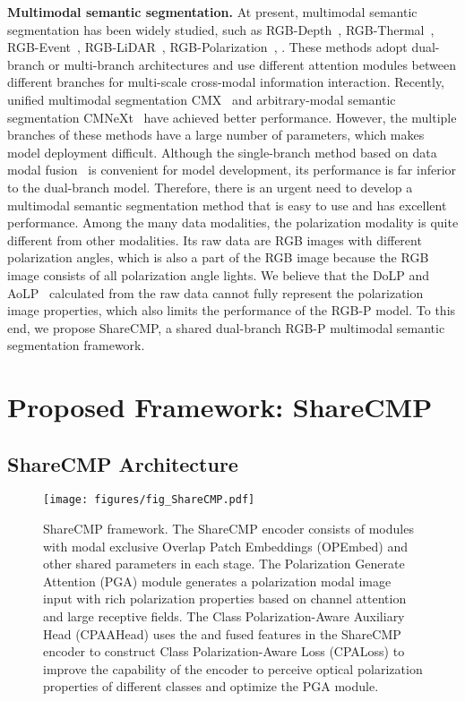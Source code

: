 \documentclass[10pt,twocolumn,letterpaper]{article}
\begin{document}
\medskip
\noindent
\textbf{Multimodal semantic segmentation.}
At present, multimodal semantic segmentation has been widely studied, such as RGB-Depth~\cite{27,28,29}, RGB-Thermal~\cite{30,31,32}, RGB-Event~\cite{33}, RGB-LiDAR~\cite{34}, RGB-Polarization~\cite{zju,mcubes,2,4,5,40}, \etc. These methods adopt dual-branch or multi-branch architectures and use different attention modules between different branches for multi-scale cross-modal information interaction. Recently, unified multimodal segmentation CMX~\cite{cmx} and arbitrary-modal semantic segmentation CMNeXt~\cite{cmnext} have achieved better performance. However, the multiple branches of these methods have a large number of parameters, which makes model deployment difficult. Although the single-branch method based on data modal fusion~\cite{43} is convenient for model development, its performance is far inferior to the dual-branch model. Therefore, there is an urgent need to develop a multimodal semantic segmentation method that is easy to use and has excellent performance. Among the many data modalities, the polarization modality is quite different from other modalities. Its raw data are RGB images with different polarization angles, which is also a part of the RGB image because the RGB image consists of all polarization angle lights. We believe that the DoLP and AoLP~\cite{5,48} calculated from the raw data cannot fully represent the polarization image properties, which also limits the performance of the RGB-P model. To this end, we propose ShareCMP, a shared dual-branch RGB-P multimodal semantic segmentation framework. \section{Proposed Framework: ShareCMP}
\label{sec:method}


\subsection{ShareCMP Architecture}
\label{sec:arch}


\begin{figure*}[t]
  \centering
   \texttt{[image: figures/fig\_ShareCMP.pdf]}
   \caption{ShareCMP framework. The ShareCMP encoder consists of modules with modal exclusive Overlap Patch Embeddings (OPEmbed) and other shared parameters in each stage. The Polarization Generate Attention (PGA) module generates a polarization modal image input with rich polarization properties based on channel attention and large receptive fields. The Class Polarization-Aware Auxiliary Head (CPAAHead) uses the  and  fused features in the ShareCMP encoder to construct Class Polarization-Aware Loss (CPALoss)  to improve the capability of the encoder to perceive optical polarization properties of different classes and optimize the PGA module.}
   \label{fig:ShareCMP}
\end{figure*} 
\end{document}
